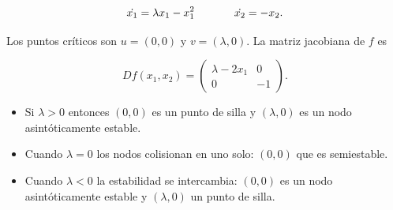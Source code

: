\begin{example} \label{ex:transcriticbifurcation}
$$ 
	\dot{x_1} = \lambda x_1 - x_1^2 \hspace{0.5in} \dot{x_2} = -x_2.
$$

Los puntos críticos son $u = (0, 0)$ y $v = (\lambda, 0)$.
La matriz jacobiana de $f$ es

$$ Df(x_1,x_2) = \left( \begin{array}{ll}
	\lambda - 2x_1 & 0 \\
	0 & -1
\end{array} \right). $$

\begin{itemize}
	\item Si $\lambda > 0$ entonces $(0,0)$ es un punto de silla y $(\lambda, 0)$ es un nodo asintóticamente estable.
	\item Cuando $\lambda = 0$ los nodos colisionan en uno solo: $(0,0)$ que es semiestable.
	\item Cuando $\lambda < 0$ la estabilidad se intercambia: $(0,0)$ es un nodo asintóticamente estable y $(\lambda, 0)$ un punto de silla.
\end{itemize}


\end{example}
